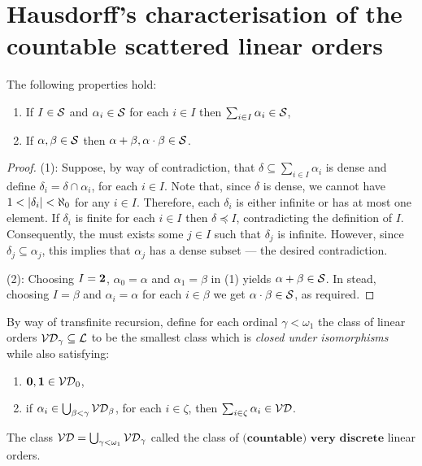 \section{Hausdorff's characterisation of the countable scattered linear orders}


\begin{prp}\label{prp:OpScattered}
        The following properties hold:
        \begin{enumerate}
            \item   If $I\in\mathcal{S}$ and $\alpha_i\in\mathcal{S}$ for each $i\in I$ then $\sum_{i\in I}\alpha_i\in\mathcal{S}$,
            \item   If $\alpha,\beta\in\mathcal{S}$ then $\alpha+\beta,\alpha\cdot\beta\in\mathcal{S}$.
        \end{enumerate}
\end{prp}

\begin{proof}
        (1):  Suppose, by way of contradiction, that $\delta\subseteq\sum_{i\in I}\alpha_i$ is dense and define $\delta_i=\delta\cap\alpha_i$, for each $i\in I$.  Note that, since $\delta$ is dense, we cannot have $1<\left\lvert\delta_i\right\rvert<\aleph_0$ for any $i\in I$.  Therefore, each $\delta_i$ is either infinite or has at most one element.  If $\delta_i$ is finite for each $i\in I$ then $\delta\preceq I$, contradicting the definition of $I$.  Consequently, the must exists some $j\in I$ such that $\delta_j$ is infinite.  However, since $\delta_j\subseteq\alpha_j$, this implies that $\alpha_j$ has a dense subset --- the desired contradiction.

        (2):  Choosing $I=\mathbf{2}$, $\alpha_0=\alpha$ and $\alpha_1=\beta$ in (1) yields $\alpha+\beta\in\mathcal{S}$.  In stead, choosing $I=\beta$ and $\alpha_i=\alpha$ for each $i\in\beta$ we get $\alpha\cdot\beta\in\mathcal{S}$, as required.
\end{proof}

\begin{dfn}
        By way of transfinite recursion, define for each ordinal $\gamma<\omega_1$ the class of linear orders $\mathcal{VD}_{\gamma}\subseteq\mathcal{L}$ to be the smallest class which is \textit{closed under isomorphisms} while also satisfying:
        \begin{enumerate}
            \item   $\mathbf{0},\mathbf{1}\in\mathcal{VD}_0$,
            \item   if $\alpha_i\in\bigcup_{\beta<\gamma}\mathcal{VD}_{\beta}$, for each $i\in \zeta$, then $\sum_{i\in\zeta}\alpha_i\in\mathcal{VD}$.
        \end{enumerate}
        The class $\mathcal{VD}=\bigcup_{\gamma<\omega_1}\mathcal{VD}_\gamma$ called the class of $\textbf{(countable) very discrete}$ linear orders.
\end{dfn}

